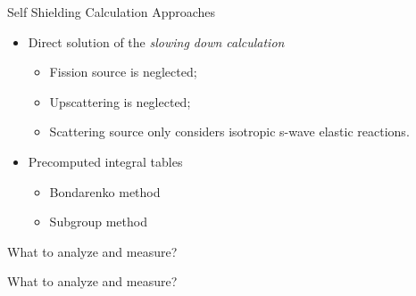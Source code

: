 \documentclass[sans,mathserif,aspectratio=169, 10pt]{beamer}
\begin{document}
\begin{frame}{Self Shielding Calculation Approaches}
\begin{itemize}[<+->]
\item Direct solution of the \emph{slowing down calculation}
	\begin{itemize}[<+->]
	\item Fission source is neglected;
	\item Upscattering is neglected;
	\item Scattering source only considers isotropic s-wave elastic reactions.
	\end{itemize}
\item Precomputed integral tables
	\begin{itemize}[<+->]
	\item Bondarenko method
	\item Subgroup method
	\end{itemize}
\end{itemize}
\end{frame}

\begin{frame}{What to analyze and measure?}
\centering
{}
\end{frame}

\begin{frame}{What to analyze and measure?}
\centering
{}
\end{frame}
\end{document}
